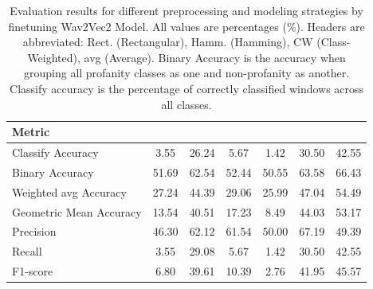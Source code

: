 \documentclass[11pt]{article}
\begin{document}
\begin{table}[H]
    \caption{Evaluation results for different preprocessing and modeling strategies by finetuning Wav2Vec2 Model. 
    All values are percentages (\%). Headers are abbreviated: Rect. (Rectangular), Hamm. (Hamming), 
    CW (Class-Weighted), avg (Average). Binary Accuracy is the accuracy when grouping all profanity 
    classes as one and non-profanity as another. Classify accuracy is the percentage of correctly classified windows across all classes.}
    \centering
    \label{tab:evaluation-results}
    \footnotesize %
    \setlength{\tabcolsep}{3pt} %
    \begin{tabular*}{\textwidth}{@{\extracolsep{\fill}} l S S S S S S}
        \toprule
        \textbf{Metric} & 
        {} &
        {} &
        {} &
        {} &
        {} &
        {} \\
        \midrule
        Classify Accuracy & 3.55 & 26.24 & 5.67 & 1.42 & 30.50 & 42.55 \\
        Binary Accuracy & 51.69 & 62.54 & 52.44 & 50.55 & 63.58 & 66.43 \\
        Weighted avg Accuracy & 27.24 & 44.39 & 29.06 & 25.99 & 47.04 & 54.49 \\
        Geometric Mean Accuracy & 13.54 & 40.51 & 17.23 & 8.49 & 44.03 & 53.17 \\
        Precision & 46.30 & 62.12 & 61.54 & 50.00 & 67.19 & 49.39 \\
        Recall & 3.55 & 29.08 & 5.67 & 1.42 & 30.50 & 42.55 \\
        F1-score & 6.80 & 39.61 & 10.39 & 2.76 & 41.95 & 45.57 \\
        \bottomrule
    \end{tabular*}
\end{table}
\end{document}
